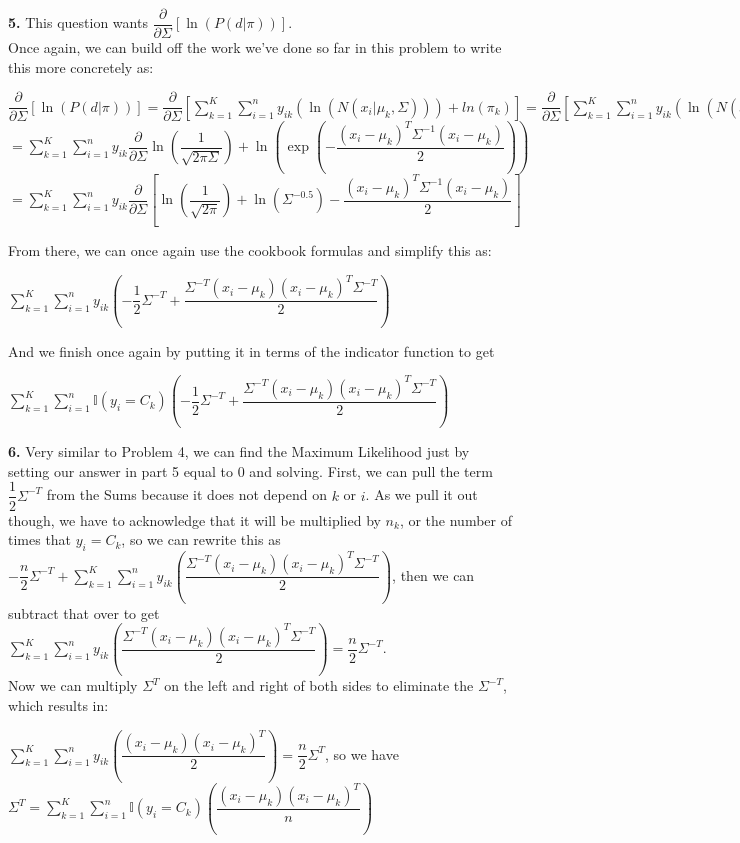 \documentclass[submit]{harvardml}
\begin{document}
 \textbf{5.} This question wants $\dfrac{\partial}{\partial \Sigma} [\ln(P(d | \pi))]$. \\
 Once again, we can build off the work we've done so far in this problem to write this more concretely as: 
 \begin{center}
  $\dfrac{\partial}{\partial \Sigma} [\ln(P(d | \pi))] = \dfrac{\partial}{\partial \Sigma}[\sum_{k=1}^{K} \sum_{i=1}^{n} y_{ik}(\ln(N(x_i | \mu_k, \Sigma))) + ln(\pi_k)] = \dfrac{\partial}{\partial \Sigma}[\sum_{k=1}^{K} \sum_{i=1}^{n} y_{ik}(\ln(N(x_i | \mu_k, \Sigma)))]$ \\
  $= \sum_{k=1}^{K} \sum_{i=1}^{n} y_{ik} \dfrac{\partial}{\partial \Sigma} \ln(\dfrac{1}{\sqrt{2\pi\Sigma}}) + \ln(\exp(-\dfrac{(x_i - \mu_k)^T \Sigma^{-1} (x_i - \mu_k)}{2}))$ \\
  $= \sum_{k=1}^{K} \sum_{i=1}^{n} y_{ik} \dfrac{\partial}{\partial \Sigma} \left[\ln(\dfrac{1}{\sqrt{2\pi}}) + \ln(\Sigma^{-0.5})-\dfrac{(x_i - \mu_k)^T \Sigma^{-1} (x_i - \mu_k)}{2}\right]$
 \end{center}
 From there, we can once again use the cookbook formulas and simplify this as: 
 \begin{center}
  $\sum_{k=1}^{K} \sum_{i=1}^{n} y_{ik} \left(-\dfrac{1}{2} \Sigma^{-T} + \dfrac{\Sigma^{-T}(x_i - \mu_k)(x_i - \mu_k)^T \Sigma^{-T}}{2}\right)$
 \end{center}
 And we finish once again by putting it in terms of the indicator function to get 
 \begin{center}
  $\sum_{k=1}^{K} \sum_{i=1}^{n} \mathbb{I}(y_i = C_k) \left(-\dfrac{1}{2} \Sigma^{-T} + \dfrac{\Sigma^{-T}(x_i - \mu_k)(x_i - \mu_k)^T \Sigma^{-T}}{2}\right)$
 \end{center}

 \textbf{6.} Very similar to Problem 4, we can find the Maximum Likelihood just by setting our answer in part 5 equal to 0 and solving. First, we can pull the term 
 $\dfrac{1}{2}\Sigma^{-T}$ from the Sums because it does not depend on $k$ or $i$. As we pull it out though, we have to acknowledge that it will be multiplied by $n_k$, 
 or the number of times that $y_i = C_k$, so we can rewrite this as $-\dfrac{n}{2}\Sigma^{-T} + \sum_{k=1}^{K} \sum_{i=1}^{n} y_{ik} \left(\dfrac{\Sigma^{-T}(x_i - \mu_k)(x_i - \mu_k)^T \Sigma^{-T}}{2}\right)$, 
 then we can subtract that over to get $\sum_{k=1}^{K} \sum_{i=1}^{n} y_{ik} \left(\dfrac{\Sigma^{-T}(x_i - \mu_k)(x_i - \mu_k)^T \Sigma^{-T}}{2}\right) = \dfrac{n}{2} \Sigma^{-T}$. \\
 Now we can multiply $\Sigma^T$ on the left and right of both sides to eliminate the $\Sigma^{-T}$, which results in: 
 \begin{center}
  $\sum_{k=1}^{K} \sum_{i=1}^{n} y_{ik} \left(\dfrac{(x_i - \mu_k)(x_i - \mu_k)^T}{2}\right) = \dfrac{n}{2} \Sigma^{T}$, so we have
  $\Sigma^T = \sum_{k=1}^{K} \sum_{i=1}^{n} \mathbb{I}(y_i = C_k) \left(\dfrac{(x_i - \mu_k)(x_i - \mu_k)^T}{n}\right)$
 \end{center}
\end{document}
